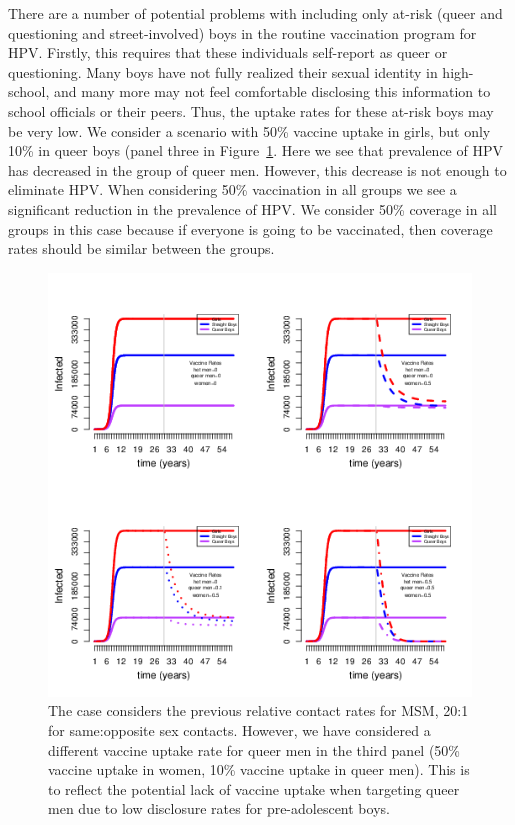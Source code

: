\documentclass[12pt]{article}
\begin{document}
There are a number of potential problems with including only at-risk (queer and questioning and street-involved) boys in the routine vaccination program for HPV. Firstly, this requires that these individuals self-report as queer or questioning.  Many boys have not fully realized their sexual identity in high-school, and many more may not feel comfortable disclosing this information to school officials or their peers.  Thus, the uptake rates for these at-risk boys may be very low.  We consider a scenario with 50\% vaccine uptake in girls, but only 10\% in queer boys (panel three in Figure~\ref{fig:example3}.  Here we see that prevalence of HPV has decreased in the group of queer men.  However, this decrease is not enough to eliminate HPV.  When considering 50\% vaccination in all groups we see a significant reduction in the prevalence of HPV.  We consider 50\% coverage in all groups in this case because if everyone is going to be vaccinated, then coverage rates should be similar between the groups. 

\begin{figure}[h!]
\includegraphics[width=\linewidth]{exampleFig/example3.png}
\caption{The case considers the previous relative contact rates for MSM, 20:1 for same:opposite sex contacts.  However, we have considered a different vaccine uptake rate for queer men in the third panel (50\% vaccine uptake in women, 10\% vaccine uptake in queer men).  This is to reflect the potential lack of vaccine uptake when targeting queer men due to low disclosure rates for pre-adolescent boys.}
\label{fig:example3}
\end{figure}
\end{document}
